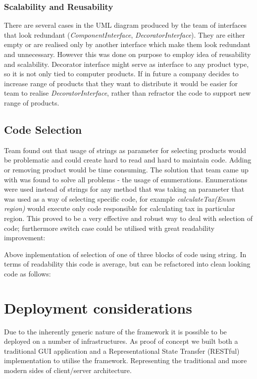 \documentclass[pdftex,11pt,a4paper]{article}
\begin{document}
\subsubsection{Scalability and Reusability}
There are several cases in the UML diagram produced by the team of interfaces that look redundant (\emph{ComponentInterface}, \emph{DecoratorInterface}). They are either empty or are realised only by another interface which make them look redundant and unnecessary. However this was done on purpose to employ idea of reusability and scalability. Decorator interface might serve as interface to any product type, so it is not only tied to computer products. If in future a company decides to increase range of products that they want to distribute it would be easier for team to realise \emph{DecoratorInterface}, rather than refractor the code to support new range of products. 

\subsection{Code Selection}
Team found out that usage of strings as parameter for selecting products would be problematic and could create hard to read and hard to maintain code. Adding or removing product would be time consuming. The solution that team came up with was found to solve all problems - the usage of enumerations. Enumerations were used instead of strings for any method that was taking an parameter that was used as a way of selecting specific code, for example \emph{calculateTax(Enum region)} would execute only code responsible for calculating tax in particular region. This proved to be a very effective and robust way to deal with selection of code; furthermore switch case could be utilised with great readability improvement:



Above inplementation of selection of one of three blocks of code using string. In terms of readability this code is average, but can be refactored into clean looking code as follows:



\pagebreak

\section{Deployment considerations}
Due to the inherently generic nature of the framework it is possible to be deployed on a number of infrastructures. As proof of concept we built both a traditional GUI application and a Representational State Transfer (RESTful)\cite{REST} implementation to utilise the framework. Representing the traditional and more modern sides of client/server architecture.
\end{document}
